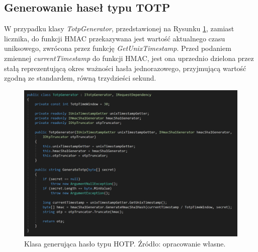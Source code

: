 \subsection{Generowanie haseł typu TOTP}
W przypadku klasy \textit{TotpGenerator}, przedstawionej na Rysunku \ref{code-totp}, zamiast licznika, do funkcji HMAC
przekazywana jest wartość aktualnego czasu uniksowego, zwrócona przez funkcję \textit{GetUnixTimestamp}. 
Przed podaniem zmiennej \textit{currentTimestamp} do funkcji HMAC, jest ona uprzednio dzielona przez stałą 
reprezentującą okres ważności hasła jednorazowego, przyjmującą wartość zgodną ze standardem, równą trzydzieści sekund.
\begin{figure}[t]
    \centering
	\includegraphics[width=\textwidth]{content/images/code-totpgenerator}
    \caption{Klasa generująca hasło typu HOTP. Źródło: opracowanie własne.}
    \label{code-totp}
\end{figure}

